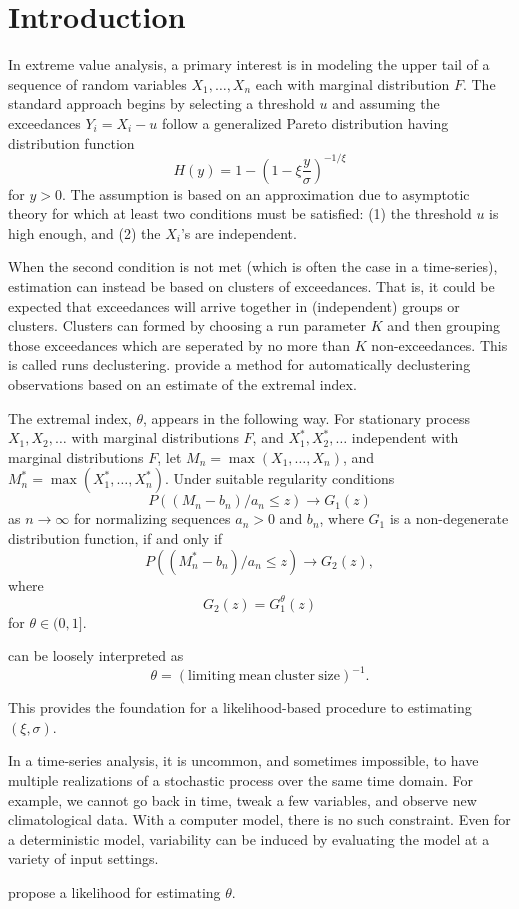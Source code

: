 \section{Introduction}
\label{intro}

In extreme value analysis, a primary interest is in modeling the upper tail of a sequence of random variables $X_1,\ldots,X_n$ each with marginal distribution $F$. The standard approach begins by selecting a threshold $u$ and assuming the exceedances $Y_i=X_i-u$ follow a generalized Pareto distribution having distribution function
\[ H(y) = 1 - \left(1 - \xi \frac{y}{\sigma}\right)^{-1/\xi} \]
for $y>0$. The assumption is based on an approximation due to asymptotic theory for which at least two conditions must be satisfied: (1) the threshold $u$ is high enough, and (2) the $X_i$'s are independent.

When the second condition is not met (which is often the case in a time-series), estimation can instead be based on clusters of exceedances. That is, it could be expected that exceedances will arrive together in (independent) groups or clusters. Clusters can formed by choosing a run parameter $K$ and then grouping those exceedances which are seperated by no more than $K$ non-exceedances. This is called runs declustering. \cite{ferro2003inference} provide a method for automatically declustering observations based on an estimate of the extremal index.

The extremal index, $\theta$, appears in the following way. For stationary process $X_1,X_2,\ldots$ with marginal distributions $F$, and $X_1^*,X_2^*,\ldots$ independent with marginal distributions $F$, let $M_n=\max(X_1,\ldots,X_n)$, and $M_n^*=\max(X_1^*,\ldots,X_n^*)$. Under suitable regularity conditions
\[ P((M_n-b_n)/a_n \leq z) \rightarrow G_1(z) \]
as $n\rightarrow\infty$ for normalizing sequences $a_n>0$ and $b_n$, where $G_1$ is a non-degenerate distribution function, if and only if
\[ P((M_n^*-b_n)/a_n \leq z) \rightarrow G_2(z),\]
where
\[ G_2(z)=G_1^\theta(z) \]
for $\theta\in(0,1]$.

can be loosely interpreted as
\[ \theta = (\mathrm{limiting~mean~cluster~size})^{-1}. \]


This provides the foundation for a likelihood-based procedure to estimating $(\xi, \sigma)$.

In a time-series analysis, it is uncommon, and sometimes impossible, to have multiple realizations of a stochastic process over the same time domain. For example, we cannot go back in time, tweak a few variables, and observe new climatological data. With a computer model, there is no such constraint. Even for a deterministic model, variability can be induced by evaluating the model at a variety of input settings.

\cite{ferro2003inference} propose a likelihood for estimating $\theta$.
